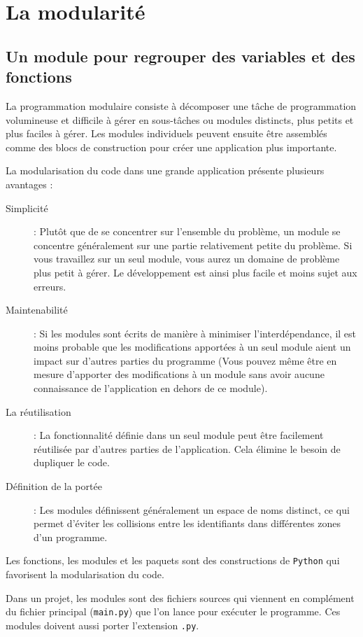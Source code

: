 \documentclass[a4paper,12pt]{book}
\begin{document}
\chapter{La modularité}
\section{Un module pour regrouper des variables et des fonctions}\label{modularité}
La programmation modulaire consiste à décomposer une tâche de programmation volumineuse et difficile à gérer en sous-tâches ou modules distincts, plus petits et plus faciles à gérer. Les modules individuels peuvent ensuite être assemblés comme des blocs de construction pour créer une application plus importante.
\medskip

La modularisation du code dans une grande application présente plusieurs avantages :
\begin{description}
	\item[Simplicité] : Plutôt que de se concentrer sur l'ensemble du problème, un module se concentre généralement sur une partie relativement petite du problème. Si vous travaillez sur un seul module, vous aurez un domaine de problème plus petit à gérer. Le développement est ainsi plus facile et moins sujet aux erreurs.
	\item[Maintenabilité] : Si les modules sont écrits de manière à minimiser l'interdépendance, il est moins probable que les modifications apportées à un seul module aient un impact sur d'autres parties du programme (Vous pouvez même être en mesure d'apporter des modifications à un module sans avoir aucune connaissance de l'application en dehors de ce module).
	\item[La réutilisation] : La fonctionnalité définie dans un seul module peut être facilement réutilisée par d'autres parties de l'application. Cela élimine le besoin de dupliquer le code.
	\item[Définition de la portée] : Les modules définissent généralement un espace de noms distinct, ce qui permet d'éviter les collisions entre les identifiants dans différentes zones d'un programme.
\end{description}
\medskip

Les fonctions, les modules et les paquets sont des constructions de \texttt{Python} qui favorisent la modularisation du code.
\medskip

Dans un projet, les modules sont des fichiers sources qui viennent en complément du fichier principal (\texttt{main.py}) que l'on lance pour exécuter le programme. Ces modules doivent aussi porter l'extension \texttt{.py}.
\medskip
\end{document}
